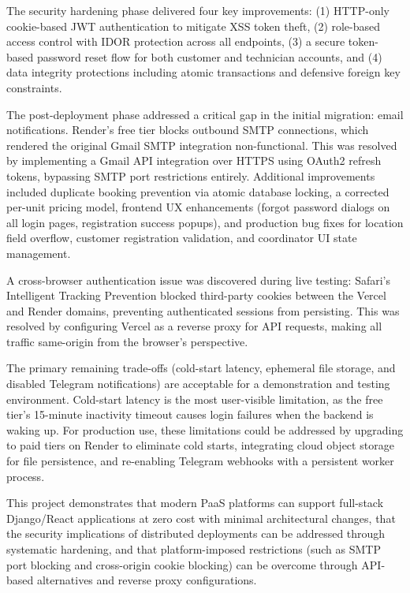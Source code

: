 \documentclass[conference]{IEEEtran}
\begin{document}
The security hardening phase delivered four key improvements: (1) HTTP-only cookie-based JWT authentication to mitigate XSS token theft, (2) role-based access control with IDOR protection across all endpoints, (3) a secure token-based password reset flow for both customer and technician accounts, and (4) data integrity protections including atomic transactions and defensive foreign key constraints.

The post-deployment phase addressed a critical gap in the initial migration: email notifications. Render's free tier blocks outbound SMTP connections, which rendered the original Gmail SMTP integration non-functional. This was resolved by implementing a Gmail API integration over HTTPS using OAuth2 refresh tokens, bypassing SMTP port restrictions entirely. Additional improvements included duplicate booking prevention via atomic database locking, a corrected per-unit pricing model, frontend UX enhancements (forgot password dialogs on all login pages, registration success popups), and production bug fixes for location field overflow, customer registration validation, and coordinator UI state management.

A cross-browser authentication issue was discovered during live testing: Safari's Intelligent Tracking Prevention blocked third-party cookies between the Vercel and Render domains, preventing authenticated sessions from persisting. This was resolved by configuring Vercel as a reverse proxy for API requests, making all traffic same-origin from the browser's perspective.

The primary remaining trade-offs (cold-start latency, ephemeral file storage, and disabled Telegram notifications) are acceptable for a demonstration and testing environment. Cold-start latency is the most user-visible limitation, as the free tier's 15-minute inactivity timeout causes login failures when the backend is waking up. For production use, these limitations could be addressed by upgrading to paid tiers on Render to eliminate cold starts, integrating cloud object storage for file persistence, and re-enabling Telegram webhooks with a persistent worker process.

This project demonstrates that modern PaaS platforms can support full-stack Django/React applications at zero cost with minimal architectural changes, that the security implications of distributed deployments can be addressed through systematic hardening, and that platform-imposed restrictions (such as SMTP port blocking and cross-origin cookie blocking) can be overcome through API-based alternatives and reverse proxy configurations.
\end{document}
